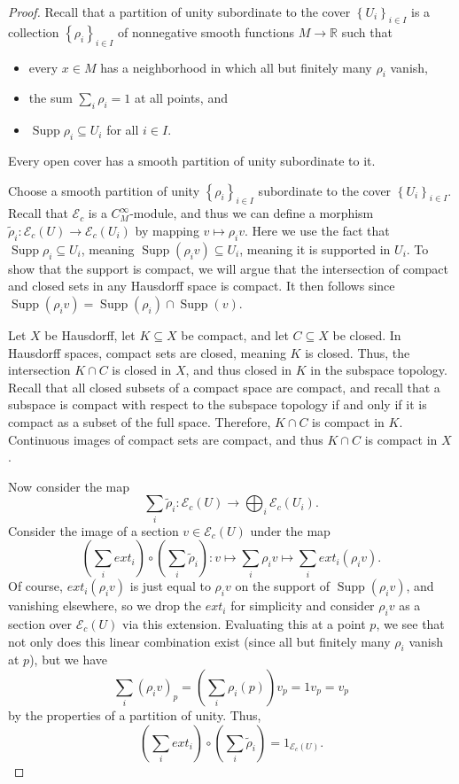 \begin{proof}
	Recall that a partition of unity subordinate to the cover $\left\{ U_i \right\} _{i\in I} $ is a collection $\left\{ \rho_i \right\}_{i\in I} $ of nonnegative smooth functions $M \to \mathbb{R} $ such that
	\begin{itemize}
		\item every $x\in M$ has a neighborhood in which all but finitely many $\rho _i$ vanish,
		\item the sum $\sum_{i} \rho _i=1$ at all points, and
		\item $\operatorname{Supp} \rho _i \subseteq U_i$ for all $i\in I$.
	\end{itemize}
	Every open cover has a smooth partition of unity subordinate to it.

	Choose a smooth partition of unity $\left\{ \rho _i \right\} _{i\in I} $ subordinate to the cover $\left\{ U_i \right\} _{i\in I} $. Recall that $\mathcal{E} _c$ is a $C^\infty_M$-module, and thus we can define a morphism $\widetilde{\rho }_i : \mathcal{E}_c(U) \to \mathcal{E}_c(U_i)$ by mapping $v\mapsto \rho _iv$. Here we use the fact that $\operatorname{Supp} \rho _i \subseteq U_i$, meaning $\operatorname{Supp} (\rho _iv) \subseteq U_i$, meaning it is supported in $U_i$. To show that the support is compact, we will argue that the intersection of compact and closed sets in any Hausdorff space is compact. It then follows since $\operatorname{Supp} (\rho _iv) = \operatorname{Supp} (\rho _i)\cap \operatorname{Supp} (v)$.

	Let $X$ be Hausdorff, let $K\subseteq X$ be compact, and let $C\subseteq X$ be closed. In Hausdorff spaces, compact sets are closed, meaning $K$ is closed. Thus, the intersection $K \cap C$ is closed in $X$, and thus closed in $K$ in the subspace topology. Recall that all closed subsets of a compact space are compact, and recall that a subspace is compact with respect to the subspace topology if and only if it is compact as a subset of the full space. Therefore, $K \cap C$ is compact in $K$. Continuous images of compact sets are compact, and thus $K \cap C$ is compact in $X$.

	Now consider the map
	\[
		\sum_{i} \widetilde{\rho }_i : \mathcal{E} _c(U) \to \bigoplus_{i} \mathcal{E} _c(U_i)
	.\]
	Consider the image of a section $v\in \mathcal{E} _c(U)$ under the map
	\[
		\left( \sum_{i} ext_i \right) \circ \left( \sum_{i} \widetilde{\rho }_i \right) : v \mapsto \sum_{i} \rho _iv \mapsto \sum_{i} ext_i(\rho _iv)
	.\]
	Of course, $ext_i(\rho _iv)$ is just equal to $\rho _iv$ on the support of $\operatorname{Supp} (\rho _iv)$, and vanishing elsewhere, so we drop the $ext_i$ for simplicity and consider $\rho _iv$ as a section over $\mathcal{E} _c(U)$ via this extension. Evaluating this at a point $p$, we see that not only does this linear combination exist (since all but finitely many $\rho _i$ vanish at $p$), but we have
	\[
		\sum_{i} (\rho _iv)_p = \left( \sum_{i} \rho _i(p) \right) v_p=  1v_p = v_p
	\]
	by the properties of a partition of unity. Thus,
	\[
		\left( \sum_{i} ext_i \right) \circ \left( \sum_{i} \widetilde{\rho }_i \right) = 1_{\mathcal{E} _c(U)} 
	.\]


\end{proof}
